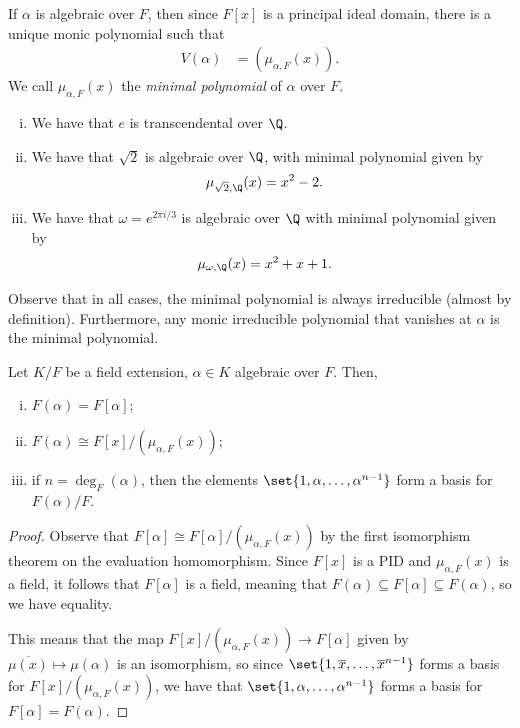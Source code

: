 \documentclass[10pt]{mypackage}
\begin{document}
If $\alpha$ is algebraic over $F$, then since $F[x]$ is a principal ideal domain, there is a unique monic polynomial such that
\begin{align*}
  V(\alpha) &= \left( \mu_{\alpha,F}(x) \right).
\end{align*}
We call $\mu_{\alpha,F}(x)$ the \textit{minimal polynomial} of $\alpha$ over $F$.
\begin{example}\hfill
  \begin{enumerate}[(i)]
    \item We have that $e$ is transcendental over $\Q$.
    \item We have that $\sqrt{2}$ is algebraic over $\Q$, with minimal polynomial given by
      \begin{align*}
        \mu_{\sqrt{2},\Q}(x) &= x^2 - 2.
      \end{align*}
    \item We have that $\omega = e^{2\pi i /3}$ is algebraic over $\Q$ with minimal polynomial given by
      \begin{align*}
        \mu_{\omega,\Q}(x) &= x^2 + x + 1.
      \end{align*}
  \end{enumerate}
\end{example}
Observe that in all cases, the minimal polynomial is always irreducible (almost by definition). Furthermore, any monic irreducible polynomial that vanishes at $\alpha$ is the minimal polynomial.
\begin{theorem}
  Let $K/F$ be a field extension, $\alpha\in K$ algebraic over $F$. Then,
  \begin{enumerate}[(i)]
    \item $F\left( \alpha \right) = F\left[ \alpha \right]$;
    \item $F\left( \alpha \right)\cong F\left[ x \right]/\left( \mu_{\alpha,F}(x) \right)$;
    \item if $n = \deg_F(\alpha)$, then the elements $\set{1,\alpha,\dots,\alpha^{n-1}}$ form a basis for $F(\alpha)/F$.
  \end{enumerate}
\end{theorem}
\begin{proof}
  Observe that $F\left[ \alpha \right]\cong F\left[ \alpha \right]/\left( \mu_{\alpha,F}(x) \right)$ by the first isomorphism theorem on the evaluation homomorphism. Since $F\left[ x \right]$ is a PID and $\mu_{\alpha,F}(x)$ is a field, it follows that $F\left[ \alpha \right]$ is a field, meaning that $F\left( \alpha \right)\subseteq F\left[ \alpha \right]\subseteq F\left( \alpha \right)$, so we have equality.

  This means that the map $F\left[ x \right]/\left( \mu_{\alpha,F}(x) \right)\rightarrow F\left[ \alpha \right]$ given by $ \overline{\mu(x)}\mapsto \mu\left( \alpha \right) $ is an isomorphism, so since $\set{1, \overline{x},\dots, \overline{x}^{n-1}}$ forms a basis for $F\left[ x \right]/\left( \mu_{\alpha,F}(x) \right)$, we have that $\set{1,\alpha,\dots,\alpha^{n-1}}$ forms a basis for $F\left[ \alpha \right] = F\left( \alpha \right)$.
\end{proof}
\end{document}
